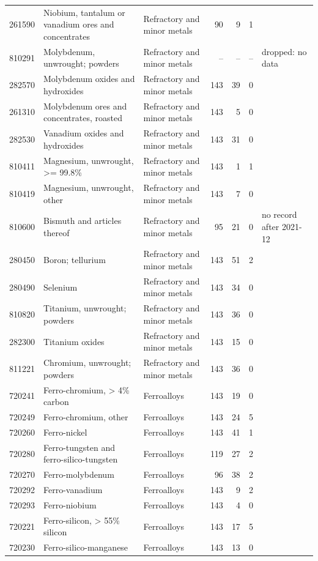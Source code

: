 \begin{minipage}{\linewidth}
\begin{tabular}{llp{3.2cm}rrrl}
261590 & Niobium, tantalum or vanadium ores and concentrates & Refractory and minor metals & 90 & 9 & 1 &  \\
810291 & Molybdenum, unwrought; powders & Refractory and minor metals & -- & -- & -- & dropped: no data \\
282570 & Molybdenum oxides and hydroxides & Refractory and minor metals & 143 & 39 & 0 &  \\
261310 & Molybdenum ores and concentrates, roasted & Refractory and minor metals & 143 & 5 & 0 &  \\
282530 & Vanadium oxides and hydroxides & Refractory and minor metals & 143 & 31 & 0 &  \\
810411 & Magnesium, unwrought, >= 99.8\% & Refractory and minor metals & 143 & 1 & 1 &  \\
810419 & Magnesium, unwrought, other & Refractory and minor metals & 143 & 7 & 0 &  \\
810600 & Bismuth and articles thereof & Refractory and minor metals & 95 & 21 & 0 & no record after 2021-12 \\
280450 & Boron; tellurium & Refractory and minor metals & 143 & 51 & 2 &  \\
280490 & Selenium & Refractory and minor metals & 143 & 34 & 0 &  \\
810820 & Titanium, unwrought; powders & Refractory and minor metals & 143 & 36 & 0 &  \\
282300 & Titanium oxides & Refractory and minor metals & 143 & 15 & 0 &  \\
811221 & Chromium, unwrought; powders & Refractory and minor metals & 143 & 36 & 0 &  \\
720241 & Ferro-chromium, > 4\% carbon & Ferroalloys & 143 & 19 & 0 &  \\
720249 & Ferro-chromium, other & Ferroalloys & 143 & 24 & 5 &  \\
720260 & Ferro-nickel & Ferroalloys & 143 & 41 & 1 &  \\
720280 & Ferro-tungsten and ferro-silico-tungsten & Ferroalloys & 119 & 27 & 2 &  \\
720270 & Ferro-molybdenum & Ferroalloys & 96 & 38 & 2 &  \\
720292 & Ferro-vanadium & Ferroalloys & 143 & 9 & 2 &  \\
720293 & Ferro-niobium & Ferroalloys & 143 & 4 & 0 &  \\
720221 & Ferro-silicon, > 55\% silicon & Ferroalloys & 143 & 17 & 5 &  \\
720230 & Ferro-silico-manganese & Ferroalloys & 143 & 13 & 0 &  \\

\end{tabular}
\end{minipage}
